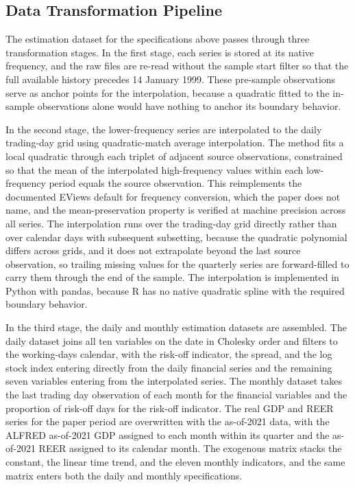 \subsection{Data Transformation Pipeline}

The estimation dataset for the specifications above passes through three transformation stages. In the first stage, each series is stored at its native frequency, and the raw files are re-read without the sample start filter so that the full available history precedes 14 January 1999. These pre-sample observations serve as anchor points for the interpolation, because a quadratic fitted to the in-sample observations alone would have nothing to anchor its boundary behavior.

In the second stage, the lower-frequency series are interpolated to the daily trading-day grid using quadratic-match average interpolation. The method fits a local quadratic through each triplet of adjacent source observations, constrained so that the mean of the interpolated high-frequency values within each low-frequency period equals the source observation. This reimplements the documented EViews default for frequency conversion, which the paper does not name, and the mean-preservation property is verified at machine precision across all series. The interpolation runs over the trading-day grid directly rather than over calendar days with subsequent subsetting, because the quadratic polynomial differs across grids, and it does not extrapolate beyond the last source observation, so trailing missing values for the quarterly series are forward-filled to carry them through the end of the sample. The interpolation is implemented in Python with pandas, because R has no native quadratic spline with the required boundary behavior.

In the third stage, the daily and monthly estimation datasets are assembled. The daily dataset joins all ten variables on the date in Cholesky order and filters to the working-days calendar, with the risk-off indicator, the spread, and the log stock index entering directly from the daily financial series and the remaining seven variables entering from the interpolated series. The monthly dataset takes the last trading day observation of each month for the financial variables and the proportion of risk-off days for the risk-off indicator. The real GDP and REER series for the paper period are overwritten with the as-of-2021 data, with the ALFRED as-of-2021 GDP assigned to each month within its quarter and the as-of-2021 REER assigned to its calendar month. The exogenous matrix stacks the constant, the linear time trend, and the eleven monthly indicators, and the same matrix enters both the daily and monthly specifications.

